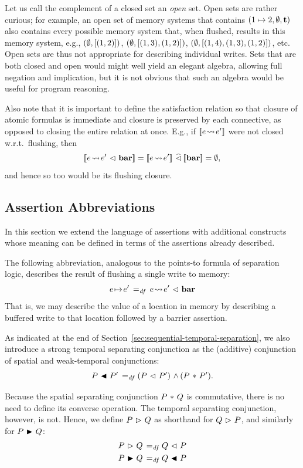 \documentclass[11pt]{report}
\begin{document}
Let us call the complement of a closed set an \emph{open} set. Open sets are rather curious; for example, an open set of memory systems that contains $(1 \mapsto 2,\operatorname{\emptyset},\mathbf{t})$ also contains every possible memory system that, when flushed, results in this memory system, e.g., $(\operatorname{\emptyset}, \left[(1,2)\right])$, $(\operatorname{\emptyset}, \left[(1,3),(1,2)\right])$, $(\operatorname{\emptyset}, \left[(1,4),(1,3),(1,2)\right])$, etc. Open sets are thus not appropriate for describing individual writes. Sets that are both closed and open would might well yield an elegant algebra, allowing full negation and implication, but it is not obvious that such an algebra would be useful for program reasoning. 

Also note that it is important to define the satisfaction relation so that closure of atomic formulas is immediate and closure is preserved by each connective, as opposed to closing the entire relation at once. E.g., if $[\![e \!\leadsto\! e']\!]$ were not closed w.r.t.~flushing, then \[\pred{e \fwriteu e' \fseq \fbaru} = \pred{e \fwriteu e'} \mseq \pred{\fbaru} = \nil,\] and hence so too would be its flushing closure.  

\subsection{Assertion Abbreviations}
\label{sec:uniprocessor-abbreviations} 

In this section we extend the language of assertions with additional constructs whose meaning can be defined in terms of the assertions already described. 

The following abbreviation, analogous to the points-to formula of separation logic, describes the result of flushing a single write to memory: \[
    e \!\mapsto\! e' \operatorname{\;=_{\mathit{df}}\;} e \!\leadsto\! e' \operatorname{\,\vartriangleleft\,} \mathbf{bar} \] That is, we may describe the value of a location in memory by describing a buffered write to that location followed by a barrier assertion. 

As indicated at the end of Section~\ref{sec:sequential-temporal-separation}, we also introduce a strong temporal separating conjunction as the (additive) conjunction of spatial and weak-temporal conjunctions: \[ P \operatorname{\,\blacktriangleleft\,} P' \operatorname{\;=_{\mathit{df}}\;} (P \operatorname{\,\vartriangleleft\,} P') \operatorname{\,\wedge\,} (P \operatorname{\,\ast\,} P').\]

Because the spatial separating conjunction $P \operatorname{\,\ast\,} Q$ is commutative, there is no need to define its converse operation. The temporal separating conjunction, however, is not. Hence, we define $P \operatorname{\,\vartriangleright\,} Q$ as shorthand for $Q \operatorname{\,\vartriangleright\,} P$, and similarly for $P \operatorname{\,\blacktriangleright\,} Q$: \begin{align*}
  P \operatorname{\,\vartriangleright\,} Q \operatorname{\;=_{\mathit{df}}\;} & Q \operatorname{\,\vartriangleleft\,} P \\ 
  P \operatorname{\,\blacktriangleright\,} Q \operatorname{\;=_{\mathit{df}}\;} & Q \operatorname{\,\blacktriangleleft\,} P \\ 
\end{align*}
\end{document}
